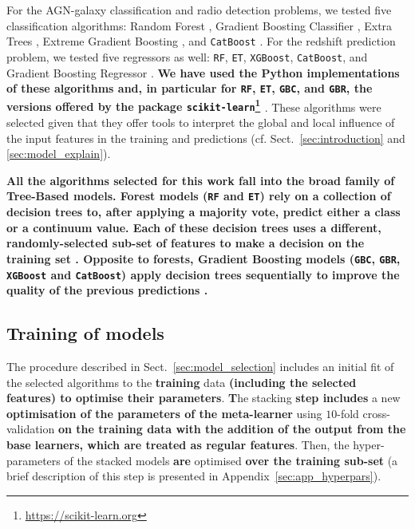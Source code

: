 \documentclass{aa}
\begin{document}
For the AGN-galaxy classification and radio detection problems, we tested five classification algorithms: Random Forest \citep[\texttt{RF};][]{Breiman2001}, Gradient Boosting Classifier \citep[\texttt{GBC};][]{10.1214/aos/1013203451}, Extra Trees \citep[\texttt{ET};][]{Geurts2006}, Extreme Gradient Boosting \citep[\texttt{XGBoost}, \texttt{v1.5.1};][]{Chen:2016:XST:2939672.2939785}, and \texttt{CatBoost} \citep[\texttt{v1.0.5};][]{DBLP:journals/corr/DorogushGGKPV17, DBLP:journals/corr/abs-1810-11363}.
For the redshift prediction problem, we tested five regressors as well: \texttt{RF}, \texttt{ET}, \texttt{XGBoost}, \texttt{CatBoost}, and Gradient Boosting Regressor \citep[\texttt{GBR};][]{10.1214/aos/1013203451}.
\textbf{We have used the Python implementations of these algorithms and, in particular for \texttt{RF}, \texttt{ET}, \texttt{GBC}, and \texttt{GBR}, the versions offered by the package \texttt{scikit-learn}\footnote{\url{https://scikit-learn.org}} \citep[\texttt{v0.23.2};][]{scikit-learn}}. These algorithms were selected given that they offer tools to interpret the global and local influence of the input features in the training and predictions (cf. Sect.~\ref{sec:introduction} and \ref{sec:model_explain}).

\textbf{All the algorithms selected for this work fall into the broad family of Tree-Based models. Forest models (\texttt{RF} and \texttt{ET}) rely on a collection of decision trees to, after applying a majority vote, predict either a class or a continuum value. Each of these decision trees uses a different, randomly-selected sub-set of features to make a decision on the training set \citep{Breiman2001}. Opposite to forests, Gradient Boosting models (\texttt{GBC}, \texttt{GBR}, \texttt{XGBoost} and \texttt{CatBoost}) apply decision trees sequentially to improve the quality of the previous predictions \citep{10.1214/aos/1013203451, FRIEDMAN2002367}.}

\subsection{Training of models}\label{sec:models_training}

The procedure described in Sect.~\ref{sec:model_selection} includes an initial fit of the selected algorithms to the \textbf{training} data \textbf{(including the selected features) to optimise their parameters}. \textbf{T}he stacking \textbf{step includes} a new \textbf{optimisation of the parameters of the meta-learner} using $10$-fold cross-validation \textbf{on the training data with the addition of the output from the base learners, which are treated as regular features}. Then, the hyper-parameters of the stacked models \textbf{are} optimised \textbf{over the training sub-set} (a brief description of this step is presented in Appendix~\ref{sec:app_hyperpars}).
\end{document}
